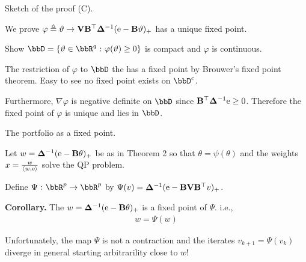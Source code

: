 \documentclass[11pt,leqno]{beamer}
\begin{document}
\begin{frame}{Sketch of the proof (C).}



We prove  $\varphi \triangleq \vartheta \to \mathbf{V} \mathbf{B}^\top
\bm{\Delta}^{-1} (\mathrm{e} - \mathbf{B} \vartheta)_+$ 
has a unique fixed point.


Show $\bbD = \{ \vartheta \in \bbR^q \cst 
\varphi (\vartheta) \ge 0\}$ is compact and $\varphi$ is 
continuous.

The restriction of $\varphi$ to $\bbD$ the has a 
fixed point by Brouwer's fixed point theorem.
Easy to see no fixed point exists on $\bbD^c$.

Furthermore, $\nabla \varphi$ is negative definite on $\bbD$ 
since $\mathbf{B}^\top \bm{\Delta}^{-1} \mathrm{e} \ge 0$.
Therefore the fixed point of $\varphi$ is unique and lies
in $\bbD$.



\end{frame}


\begin{frame}{The portfolio as a fixed point.}

Let $w = \bm{\Delta}^{-1} (\mathrm{e} - \mathbf{B} \theta)_+$
be as in Theorem 2 so that $\theta = \psi(\theta)$ and 
the weights $x = \frac{w}{\langle w, \mathrm{e} \rangle}$ solve the QP problem.

Define $\Psi \cst \bbR^p \to \bbR^p$ by 
$\Psi (v) = \bm{\Delta}^{-1} (\mathrm{e} - \mathbf{B} \mathbf{V} \mathbf{B}^\top 
 v)_+$. 

{\bf Corollary.} The $w = \bm{\Delta}^{-1} (\mathrm{e} - \mathbf{B} \theta)_+$
is a fixed point of $\Psi$. i.e.,
\begin{align}
   w = \Psi (w) 
\end{align}


Unfortunately, the map $\Psi$ is not a contraction and the 
iterates $v_{k+1} = \Psi(v_k)$ diverge in general 
starting arbitrarility close to $w$!


\end{frame}
\end{document}
